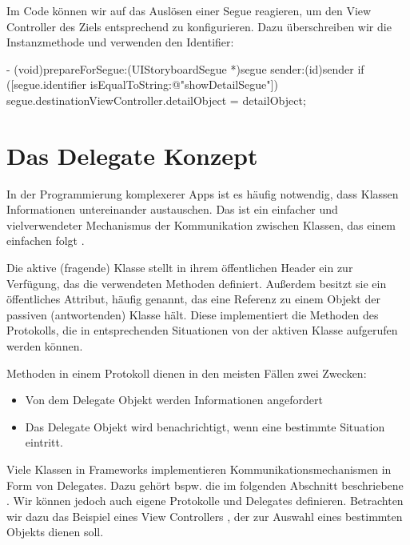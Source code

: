 \documentclass[parskip=half, final]{scrreprt}
\begin{document}
Im Code können wir auf das Auslösen einer Segue reagieren, um den View Controller des Ziels entsprechend zu konfigurieren. Dazu überschreiben wir die  Instanzmethode und verwenden den Identifier:

\begin{objclst}
- (void)prepareForSegue:(UIStoryboardSegue *)segue sender:(id)sender
{
    if ([segue.identifier isEqualToString:@"showDetailSegue"]) {
        segue.destinationViewController.detailObject = detailObject;
    }
}
\end{objclst}


\section{Das Delegate Konzept}\label{sec:delegate_konzept}

In der Programmierung komplexerer Apps ist es häufig notwendig, dass Klassen Informationen untereinander austauschen. Das  ist ein einfacher und vielverwendeter Mechanismus der  Kommunikation zwischen Klassen, das einem einfachen  folgt .


Die aktive (fragende) Klasse stellt in ihrem öffentlichen Header ein  zur Verfügung, das die verwendeten Methoden definiert. Außerdem besitzt sie ein öffentliches Attribut, häufig  genannt, das eine Referenz zu einem Objekt der passiven (antwortenden) Klasse hält. Diese implementiert die Methoden des Protokolls, die in entsprechenden Situationen von der aktiven Klasse aufgerufen werden können.

Methoden in einem Protokoll dienen in den meisten Fällen zwei Zwecken:
\begin{itemize}
\item Von dem Delegate Objekt werden Informationen angefordert
\item Das Delegate Objekt wird benachrichtigt, wenn eine bestimmte Situation eintritt.
\end{itemize}

Viele Klassen in Frameworks implementieren Kommunikationsmechanismen in Form von Delegates. Dazu gehört bspw. die im folgenden Abschnitt beschriebene . Wir können jedoch auch eigene Protokolle und Delegates definieren. Betrachten wir dazu das Beispiel eines View Controllers , der zur Auswahl eines bestimmten Objekts dienen soll.
\end{document}
